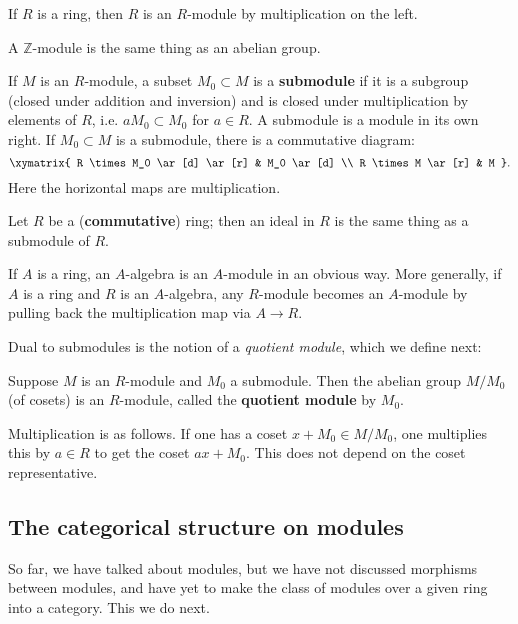 \begin{example} 
If $R$ is a ring, then $R$ is an $R$-module by multiplication on the left. 
\end{example} 
\begin{example} 
A $\mathbb{Z}$-module is the same thing as an abelian group.
\end{example} 

\begin{definition} 
If $M$ is an $R$-module, a subset $M_0 \subset M$ is a \textbf{submodule} if it
is a subgroup (closed under addition and inversion) and is closed under
multiplication by elements of $R$, i.e. $aM_0 \subset M_0$ for $a \in R$. A
submodule is a module in its own right. If $M_0 \subset M$ is a submodule,
there is a commutative diagram:
\[ \xymatrix{
R \times M_0 \ar[d] \ar[r] &  M_0 \ar[d] \\ R \times M \ar[r] &  M
}.\]
Here the horizontal maps are multiplication.
\end{definition} 

\begin{example} 
Let $R$ be a (\textbf{commutative}) ring; then an ideal in $R$ is the same thing as a
submodule of $R$.
\end{example} 

\begin{example} 
If $A$ is a ring, an $A$-algebra is an $A$-module in an obvious way. More
generally, if $A$ is a ring and $R$ is an $A$-algebra, any $R$-module becomes
an $A$-module by pulling back the multiplication map via $A \to R$. 
\end{example} 



Dual to submodules  is the notion of a \emph{quotient module}, which we define
next:
\begin{definition} Suppose $M$ is an $R$-module and $M_0$  a
submodule.  Then the abelian group $M/M_0$ (of cosets)  is an $R$-module,
called the \textbf{quotient module} by $M_0$.  

Multiplication is as follows. If
one has a coset $x  + M_0 \in M/M_0$, one  multiplies this by $a \in R$ to
get the coset $ax
+ M_0$. This does not depend on the coset representative.  
\end{definition} 


\subsection{The categorical structure on modules}
So far, we have talked about modules, but we have not discussed morphisms
between modules, and have yet to make the class of modules over a given ring
into a category. This we do next.

